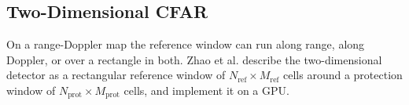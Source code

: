 \subsection{Two-Dimensional CFAR}
\label{subsec:th.cfar.2d}
\todo{}
On a range-Doppler map the reference window can run along range, along Doppler, or over a rectangle in both. Zhao et al. \citep{zhao2023} describe the two-dimensional detector as a rectangular reference window of $N_{\mathrm{ref}} \times M_{\mathrm{ref}}$ cells around a protection window of $N_{\mathrm{prot}} \times M_{\mathrm{prot}}$ cells, and implement it on a GPU.

